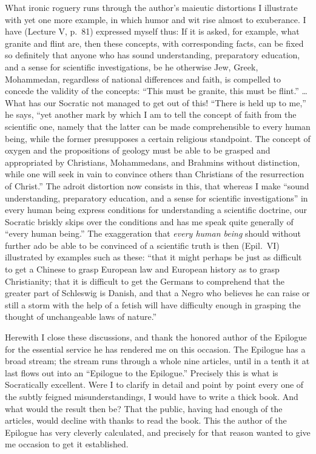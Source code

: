 \documentclass[12pt]{book}
\newcommand{\opage}[1]{\marginnote{\footnotesize\textit{[#1]}}}
\begin{document}
What ironic roguery runs through the author's maieutic distortions I
illustrate with yet one more example, in which humor and wit rise almost
to exuberance. I have (Lecture V, p.~81) expressed myself thus: If it is
asked, for example, what granite and flint are, then these concepts, with
corresponding facts, can be fixed so definitely that anyone who has
\opage{322}\setcounter{footnote}{0}%
sound understanding, preparatory education, and a sense for scientific
investigations, be he otherwise Jew, Greek, Mohammedan, regardless of
national differences and faith, is compelled to concede the validity of
the concepts: ``This must be granite, this must be flint.'' \ldots{} What
has our Socratic not managed to get out of this! ``There is held up to
me,'' he says, ``yet another mark by which I am to tell the concept of
faith from the scientific one, namely that the latter can be made
comprehensible to every human being, while the former presupposes a
certain religious standpoint. The concept of oxygen and the propositions
of geology must be able to be grasped and appropriated by Christians,
Mohammedans, and Brahmins without distinction, while one will seek in
vain to convince others than Christians of the resurrection of Christ.''
The adroit distortion now consists in this, that whereas I make ``sound
understanding, preparatory education, and a sense for scientific
investigations'' in every human being express conditions for
understanding a scientific doctrine, our Socratic briskly skips over the
conditions and has me speak quite generally of ``every human being.'' The
exaggeration that \emph{every human being} should without further ado be
able to be convinced of a scientific truth is then (Epil.\ VI) illustrated
by examples such as these: ``that it might perhaps be just as difficult to
get a Chinese to grasp European law and European history as to grasp
Christianity; that it is difficult to get the Germans to comprehend that
the greater part of Schleswig is Danish, and that a Negro who believes he
can raise or still a storm with the help of a fetish will have difficulty
enough in grasping the thought of unchangeable laws of nature.''

Herewith I close these discussions, and thank the honored author of the
Epilogue for the essential service he has rendered me on this occasion.
The Epilogue has a broad stream; the stream runs through a whole nine
articles, until in a
\opage{323}\setcounter{footnote}{0}%
tenth it at last flows out into an ``Epilogue to the Epilogue.'' Precisely
this is what is Socratically excellent. Were I to clarify in detail and
point by point every one of the subtly feigned misunderstandings, I would
have to write a thick book. And what would the result then be? That the
public, having had enough of the articles, would decline with thanks to
read the book. This the author of the Epilogue has very cleverly
calculated, and precisely for that reason wanted to give me occasion to
get it established.
\end{document}
